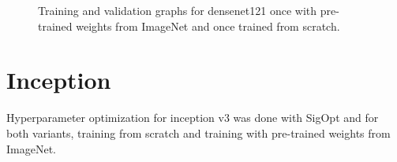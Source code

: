 \begin{figure}[h]
\centering
\caption{Training and validation graphs for densenet121 once with pre-trained weights from ImageNet and once trained from scratch.}
\label{fig:densenet121-graph}
\end{figure}














\section{Inception}


Hyperparameter optimization for inception v3 was done with SigOpt and for both variants, training from scratch and training with pre-trained weights from ImageNet.

\begin{table}[h] \centering
{}
\caption{Hyper parameters for inception v3 optimized with SigOpt. First row shows hyperparameters training the architecture from scratch. Second row used pre-trained weights from ImageNet}
\label{tbl:Inceptionv3}
\end{table}

